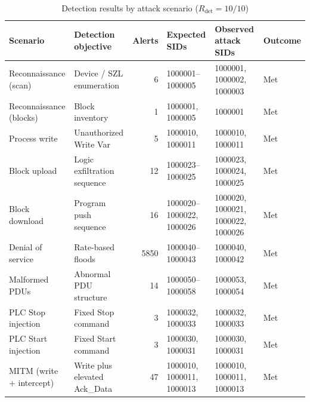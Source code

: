 \begin{table}[H]
    \centering
    \scriptsize
    \begin{tabular}{|p{2.2cm}|p{2.5cm}|r|p{2.0cm}|p{2.8cm}|p{1.5cm}|}
        \hline
        \textbf{Scenario} & \textbf{Detection objective} & \textbf{Alerts} & \textbf{Expected SIDs} & \textbf{Observed attack SIDs} & \textbf{Outcome} \\
        \hline
        Reconnaissance (scan) & Device / SZL enumeration & 6 & 1000001--1000005 & 1000001, 1000002, 1000003 & Met \\
        \hline
        Reconnaissance (blocks) & Block inventory & 1 & 1000001, 1000005 & 1000001 & Met \\
        \hline
        Process write & Unauthorized Write Var & 5 & 1000010, 1000011 & 1000010, 1000011 & Met \\
        \hline
        Block upload & Logic exfiltration sequence & 12 & 1000023--1000025 & 1000023, 1000024, 1000025 & Met \\
        \hline
        Block download & Program push sequence & 16 & 1000020--1000022, 1000026 & 1000020, 1000021, 1000022, 1000026 & Met \\
        \hline
        Denial of service & Rate-based floods & 5850 & 1000040--1000043 & 1000040, 1000042 & Met \\
        \hline
        Malformed PDUs & Abnormal PDU structure & 14 & 1000050--1000058 & 1000053, 1000054 & Met \\
        \hline
        PLC Stop injection & Fixed Stop command & 3 & 1000032, 1000033 & 1000032, 1000033 & Met \\
        \hline
        PLC Start injection & Fixed Start command & 3 & 1000030, 1000031 & 1000030, 1000031 & Met \\
        \hline
        MITM (write + intercept) & Write plus elevated Ack\_Data & 47 & 1000010, 1000011, 1000013 & 1000010, 1000011, 1000013 & Met \\
        \hline
    \end{tabular}
    \caption{Detection results by attack scenario ($R_{\mathrm{det}} = 10/10$)}
    \label{tab:eval-detection-summary}
\end{table}

